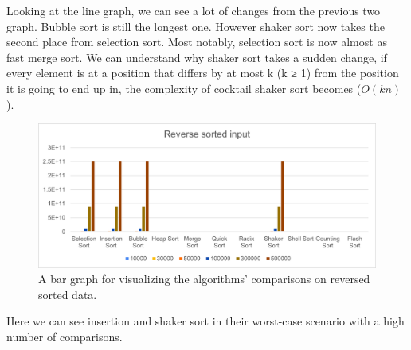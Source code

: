 \documentclass{article}
\newcommand\tab[1][0.5cm]{\hspace*{#1}}
\begin{document}
\tab Looking at the line graph, we can see a lot of changes from the previous two graph. Bubble sort is still the longest one. However shaker sort now takes the second place from selection sort. Most notably, selection sort is now almost as fast merge sort. We can understand why shaker sort takes a sudden change, if every element is at a position that differs by at most k (k ≥ 1) from the position it is going to end up in, the complexity of cocktail shaker sort becomes ($O(kn)$).

\begin{figure}[H]
\includegraphics[scale = 0.8]{!SortedBar.png}
\caption{A bar graph for visualizing the algorithms’ comparisons on reversed sorted data.}
\centering
\end{figure}

Here we can see insertion and shaker sort in their worst-case scenario with a high number of comparisons.
\end{document}
